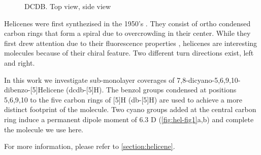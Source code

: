	\begin{figure}[h!]
		\centering
		 \quad
		 \quad
		\caption{DCDB.  Top view,  side view}
		\label{fig:helicene}
	\end{figure}
	
	Helicenes were first synthezised in the 1950's \cite{Newman_synthesis_1956}. They consist of ortho condensed carbon rings that form a spiral due to overcrowding in their center. While they first drew attention due to their fluorescence properties \cite{vander_donckt_fluorescence_1968}, helicenes are interesting molecules because of their chiral feature. Two different turn directions exist, left and right.  
	
	In this work we investigate sub-monolayer coverages of 7,8-dicyano-5,6,9,10-dibenzo-[5]Helicene (dcdb-[5]H). The benzol groups condensed at positions 5,6,9,10 to the five carbon rings of [5]H (db-[5]H) are used to achieve a more distinct footprint of the molecule. Two cyano groups added at the central carbon ring induce a permanent dipole moment of 6.3 D (\autoref{fig:hel-fig1}a,b) and complete the molecule we use here. 

	For more information, please refer to \autoref{section:helicene}.